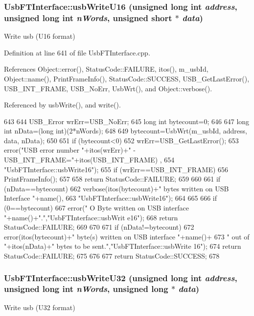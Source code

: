 \hypertarget{classUsbFTInterface_aa37ff87bb675d1671ee7a92ee83500b9}{
\subsubsection[{usbWriteU16}]{ UsbFTInterface::usbWriteU16 (unsigned long int {\em address}, \/  unsigned long int {\em nWords}, \/  unsigned short $\ast$ {\em data})}}
\label{classUsbFTInterface_aa37ff87bb675d1671ee7a92ee83500b9}
Write usb (U16 format) 

Definition at line 641 of file UsbFTInterface.cpp.

References Object::error(), StatusCode::FAILURE, itos(), m\_\-usbId, Object::name(), PrintFrameInfo(), StatusCode::SUCCESS, USB\_\-GetLastError(), USB\_\-INT\_\-FRAME, USB\_\-NoErr, UsbWrt(), and Object::verbose().

Referenced by usbWrite(), and write().


\begin{DoxyCode}
643                                                                {
644   USB_Error wrErr=USB_NoErr;
645   long int  bytecount=0;
646 
647   long int nData=(long int)(2*nWords);
648 
649   bytecount=UsbWrt(m_usbId, address, data, nData);
650 
651   if (bytecount<0){
652     wrErr=USB_GetLastError();
653     error("USB error number "+itos(wrErr)+" - USB_INT_FRAME="+itos(USB_INT_FRAME)
      ,
654             "UsbFTInterface::usbWrite16");
655     if (wrErr==USB_INT_FRAME){
656       PrintFrameInfo();
657     } 
658     return StatusCode::FAILURE;
659   }
660 
661   if (nData==bytecount){
662     verbose(itos(bytecount)+" bytes written on USB Interface "+name(),
663             "UsbFTInterface::usbWrite16");
664   }
665   
666   if (0==bytecount){
667     error(" O Byte written on USB interface "+name()+".","UsbFTInterface::usbWrit
      e16");
668     return StatusCode::FAILURE;
669   }
670 
671   if (nData!=bytecount){
672     error(itos(bytecount)+" byte(s) written on USB interface "+name()+
673             " out of "+itos(nData)+" bytes to be sent.","UsbFTInterface::usbWrite
      16");
674     return StatusCode::FAILURE;    
675   }
676 
677   return StatusCode::SUCCESS;  
678 }
\end{DoxyCode}
\hypertarget{classUsbFTInterface_ac5eac42e444c9b0f19f0f70598c51b20}{
\subsubsection[{usbWriteU32}]{ UsbFTInterface::usbWriteU32 (unsigned long int {\em address}, \/  unsigned long int {\em nWords}, \/  unsigned long $\ast$ {\em data})}}
\label{classUsbFTInterface_ac5eac42e444c9b0f19f0f70598c51b20}
Write usb (U32 format) 

